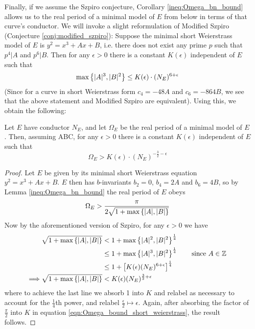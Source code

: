 Finally, if we assume the Szpiro conjecture, Corollary \ref{ineq:Omega_bn_bound} allows us to the real period of a minimal model of $E$ from below in terms of that curve's conductor. We will invoke a slight reformulation of Modified Szpiro (Conjecture \ref{conj:modified_szpiro}): Suppose the minimal short Weierstrass model of $E$ is $y^2 = x^3+Ax+B$, i.e. there does not exist any prime $p$ such that $p^4|A$ and $p^6|B$. Then for any $\epsilon>0$ there is a constant $K(\epsilon)$ independent of $E$ such that
\begin{equation}
\max\left\{|A|^3,|B|^2\right\} \le K(\epsilon)\cdot (N_E)^{6+\epsilon}
\end{equation}
(Since for a curve in short Weierstrass form $c_4 = -48A$ and $c_6=-864B$, we see that the above statement and Modified Szpiro are equivalent). Using this, we obtain the following:
\begin{theorem}[ABC]
\label{thm:real_period_lower_bound}
Let $E$ have conductor $N_E$, and let $\Omega_E$ be the real period of a minimal model of $E$. Then, assuming ABC, for any $\epsilon>0$ there is a constant $K(\epsilon)$ independent of $E$ such that 
\begin{equation}
\Omega_E > K(\epsilon) \cdot (N_E)^{-\frac{3}{2}-\epsilon}
\end{equation}
\end{theorem}
\begin{proof}
Let $E$ be given by its minimal short Weierstrass equation $y^2 = x^3+Ax+B$. $E$ then has $b$-invariants $b_2=0$, $b_4 = 2A$ and $b_6 = 4B$, so by Lemma \ref{ineq:Omega_bn_bound} the real period of $E$ obeys
\begin{equation}\label{eqn:Omega_bound_short_weierstrass}
\Omega_E > \frac{\pi}{2\sqrt{1+\max\left\{|A|,|B|\right\}}}
\end{equation}
Now by the aforementioned version of Szpiro, for any $\epsilon>0$ we have
\begin{align*}
\sqrt{1+\max\left\{|A|,|B|\right\}} &<  1 + \max\left\{|A|^2,|B|^2\right\}^\frac{1}{4} \\
&\le 1 + \max\left\{|A|^3,|B|^2\right\}^\frac{1}{4} \quad\quad\mbox{since $A \in \mathbb{Z}$} \\
&\le 1 +\left[K(\epsilon) (N_E)^{6+\epsilon} \right]^\frac{1}{4} \\
\Longrightarrow \sqrt{1+\max\left\{|A|,|B|\right\}} &< K(\epsilon) (N_E)^{\frac{3}{2}+\epsilon}
\end{align*}
where to achieve the last line we absorb 1 into $K$ and relabel as necessary to account for the $\frac{1}{4}$th power, and relabel $\frac{\epsilon}{2} \mapsto \epsilon$. Again, after absorbing the factor of $\frac{\pi}{2}$ into $K$ in equation \ref{eqn:Omega_bound_short_weierstrass}, the result follows.
\end{proof}

